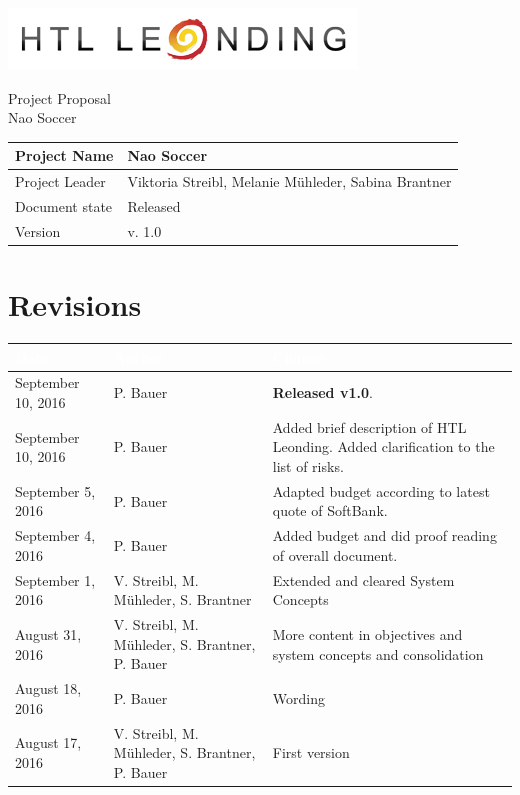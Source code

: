 \documentclass[12pt]{article}
\theoremstyle{definition}
\newcommand{\projectname}{Nao Soccer}
\newcommand{\productname}{Nao Soccer}
\newcommand{\projectleader}{Viktoria Streibl, Melanie Mühleder, Sabina Brantner}
\newcommand{\documentstatus}{Released}
\newcommand{\version}{v. 1.0}
\begin{document}
\begin{titlepage}
\begin{flushright}
\includegraphics[scale=.5]{htlleondinglogo.png}\\
\end{flushright}

\vspace{10em}

\begin{center}
{\Huge Project Proposal} \\[3em]
{\LARGE \productname} \\[3em]
\end{center}

\begin{flushleft}
\begin{tabular}{|l|l|}
\hline
Project Name & \projectname \\ \hline
Project Leader & \projectleader \\ \hline
Document state & \documentstatus \\ \hline
Version & \version \\ \hline
\end{tabular}
\end{flushleft}

\end{titlepage}
\section*{Revisions}
\begin{tabular}{|p{.25\linewidth}|p{.3\linewidth}|p{.37\linewidth}|}
\hline
\cellcolor[gray]{0.5}\textcolor{white}{Date} & \cellcolor[gray]{0.45}\textcolor{white}{Author} & \cellcolor[gray]{0.5}\textcolor{white}{Change} \\ \hline
September 10, 2016&P. Bauer&{\bf Released v1.0}. \\ \hline
September 10, 2016&P. Bauer&Added brief description of HTL Leonding. Added clarification to the list of risks. \\ \hline
September 5, 2016&P. Bauer&Adapted budget according to latest quote of SoftBank. \\ \hline
September 4, 2016&P. Bauer&Added budget and did proof reading of overall document. \\ \hline
September 1, 2016&V. Streibl, M. Mühleder, S. Brantner&Extended and cleared System Concepts \\ \hline
August 31, 2016&V. Streibl, M. Mühleder, S. Brantner, P. Bauer&More content in objectives and system concepts and consolidation \\ \hline
August 18, 2016&P. Bauer&Wording \\ \hline
August 17, 2016&V. Streibl, M. Mühleder, S. Brantner, P. Bauer&First version \\ \hline
\end{tabular}
\pagebreak
\end{document}

